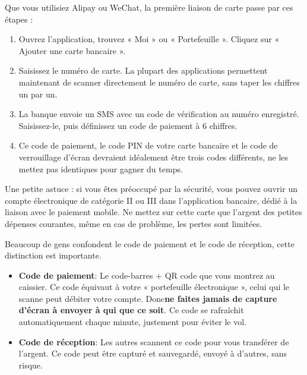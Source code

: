 


Que vous utilisiez Alipay ou WeChat, la première liaison de carte passe par ces étapes :

\begin{enumerate}
  \item Ouvrez l'application, trouvez « Moi » ou « Portefeuille ». Cliquez sur « Ajouter une carte bancaire ».
  \item Saisissez le numéro de carte. La plupart des applications permettent maintenant de scanner directement le numéro de carte, sans taper les chiffres un par un.
  \item La banque envoie un SMS avec un code de vérification au numéro enregistré. Saisissez-le, puis définissez un code de paiement à 6 chiffres.
  \item Ce code de paiement, le code PIN de votre carte bancaire et le code de verrouillage d'écran devraient idéalement être trois codes différents, ne les mettez pas identiques pour gagner du temps.
\end{enumerate}

Une petite astuce : si vous êtes préoccupé par la sécurité, vous pouvez ouvrir un compte électronique de catégorie II ou III dans l'application bancaire, dédié à la liaison avec le paiement mobile. Ne mettez sur cette carte que l'argent des petites dépenses courantes, même en cas de problème, les pertes sont limitées.


Beaucoup de gens confondent le code de paiement et le code de réception, cette distinction est importante.

\begin{itemize}
  \item \textbf{Code de paiement}: Le code-barres + QR code que vous montrez au caissier. Ce code équivaut à votre « portefeuille électronique », celui qui le scanne peut débiter votre compte. Donc\textbf{ne faites jamais de capture d'écran à envoyer à qui que ce soit}. Ce code se rafraîchit automatiquement chaque minute, justement pour éviter le vol.
  \item \textbf{Code de réception}: Les autres scannent ce code pour vous transférer de l'argent. Ce code peut être capturé et sauvegardé, envoyé à d'autres, sans risque.
\end{itemize}

